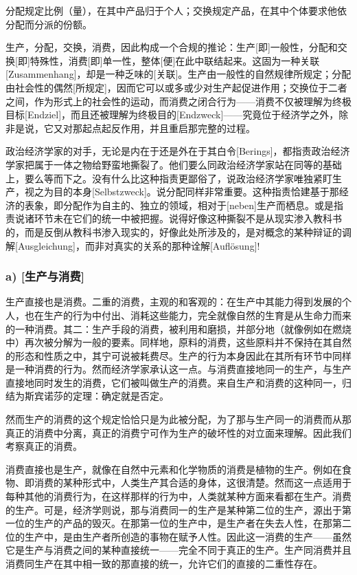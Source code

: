 \documentclass[a4paper,twoside,12pt]{ctexart}
\begin{document}
分配规定比例（量），在其中产品归于个人；交换规定产品，在其中个体要求他依分配而分派的份额。

生产，分配，交换，消费，因此构成一个合规的推论：生产[即]一般性，分配和交换[即]特殊性，消费[即]单一性，整体[便]在此中联结起来。这固为一种关联[Zusammenhang]，却是一种乏味的[关联]。生产由一般性的自然规律所规定；分配由社会性的偶然[所规定]，因而它可以或多或少对生产起促进作用；交换位于二者之间，作为形式上的社会性的运动，而消费之闭合行为——消费不仅被理解为终极目标[Endziel]，而且还被理解为终极目的[Endzweck]——究竟位于经济学之外，除非是说，它又对那起点起反作用，并且重启那完整的过程。

政治经济学家的对手，无论是内在于还是外在于其白令[Berings]，都指责政治经济学家把属于一体之物给野蛮地撕裂了。他们要么同政治经济学家站在同等的基础上，要么等而下之。没有什么比这种指责更鄙俗了，说政治经济学家唯独紧盯生产，视之为目的本身[Selbstzweck]。说分配同样非常重要。这种指责恰建基于那经济的表象，即分配作为自主的、独立的领域，相对于[neben]生产而栖息。或是指责说诸环节未在它们的统一中被把握。说得好像这种撕裂不是从现实渗入教科书的，而是反倒从教科书渗入现实的，好像此处所涉及的，是对概念的某种辩证的调解[Ausgleichung]，而非对真实的关系的那种诠解[Auflösung]!

\subsubsection{a) [生产与消费]}

生产直接也是消费。二重的消费，主观的和客观的：在生产中其能力得到发展的个人，也在生产的行为中付出、消耗这些能力，完全就像自然的生育是从生命力而来的一种消费。其二：生产手段的消费，被利用和磨损，并部分地（就像例如在燃烧中）再次被分解为一般的要素。同样地，原料的消费，这些原料并不保持在其自然的形态和性质之中，其宁可说被耗费尽。生产的行为本身因此在其所有环节中同样是一种消费的行为。然而经济学家承认这一点。与消费直接地同一的生产，与生产直接地同时发生的消费，它们被叫做生产的消费。来自生产和消费的这种同一，归结为斯宾诺莎的定理：确定就是否定。

然而生产的消费的这个规定恰恰只是为此被分配，为了那与生产同一的消费而从那真正的消费中分离，真正的消费宁可作为生产的破坏性的对立面来理解。因此我们考察真正的消费。

消费直接也是生产，就像在自然中元素和化学物质的消费是植物的生产。例如在食物、即消费的某种形式中，人类生产其合适的身体，这很清楚。然而这一点适用于每种其他的消费行为，在这样那样的行为中，人类就某种方面来看都在生产。消费的生产。可是，经济学则说，那与消费同一的生产是某种第二位的生产，源出于第一位的生产的产品的毁灭。在那第一位的生产中，是生产者在失去人性，在那第二位的生产中，是由生产者所创造的事物在赋予人性。因此这一消费的生产——虽然它是生产与消费之间的某种直接统一——完全不同于真正的生产。生产同消费并且消费同生产在其中相一致的那直接的统一，允许它们的直接的二重性存在。
\end{document}

